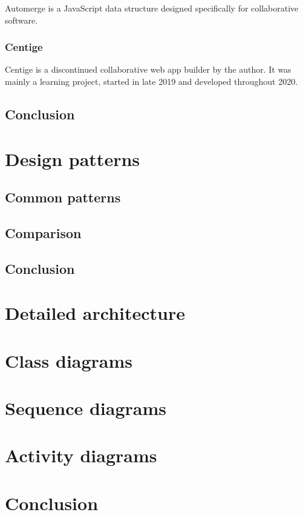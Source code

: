 Automerge is a JavaScript data structure designed specifically for collaborative software.


\subsubsection{Centige}

Centige is a discontinued collaborative web app builder by the author.
It was mainly a learning project, started in late 2019 and developed throughout 2020.


\subsection{Conclusion}

\section{Design patterns}
\subsection{Common patterns}
\subsection{Comparison}
\subsection{Conclusion}

\section{Detailed architecture}
\section{Class diagrams}
\section{Sequence diagrams}
\section{Activity diagrams}

\section{Conclusion}